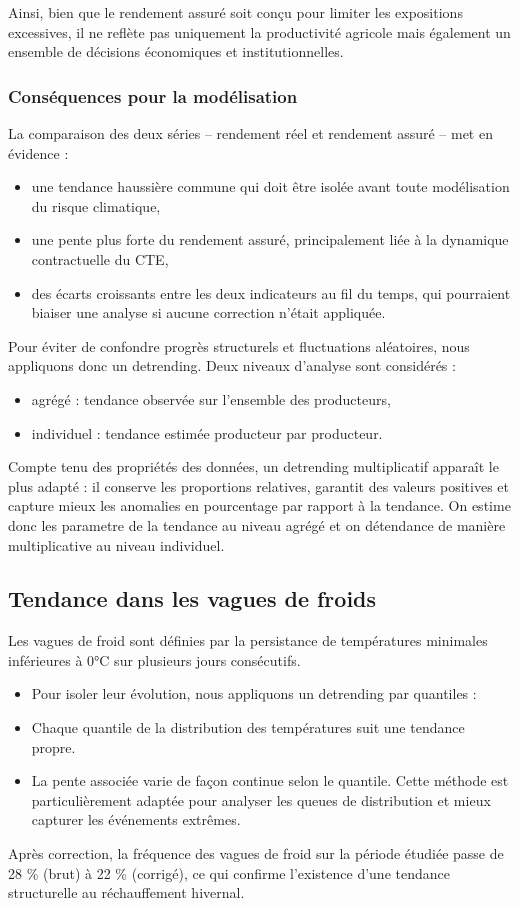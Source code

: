 \documentclass[11pt,a4paper,openright,twoside]{report}
\begin{document}
Ainsi, bien que le rendement assuré soit conçu pour limiter les expositions excessives, il ne reflète pas uniquement la productivité agricole mais également un ensemble de décisions économiques et institutionnelles.

\subsubsection{Conséquences pour la modélisation}
La comparaison des deux séries – rendement réel et rendement assuré – met en évidence :
\begin{itemize}
    \item une tendance haussière commune qui doit être isolée avant toute modélisation du risque climatique,
    \item une pente plus forte du rendement assuré, principalement liée à la dynamique contractuelle du CTE,
    \item des écarts croissants entre les deux indicateurs au fil du temps, qui pourraient biaiser une analyse si aucune correction n’était appliquée.
\end{itemize}
Pour éviter de confondre progrès structurels et fluctuations aléatoires, nous appliquons donc un detrending. Deux niveaux d’analyse sont considérés :
\begin{itemize}
    \item agrégé : tendance observée sur l’ensemble des producteurs,
    \item individuel : tendance estimée producteur par producteur.
\end{itemize}
Compte tenu des propriétés des données, un detrending multiplicatif apparaît le plus adapté : il conserve les proportions relatives, garantit des valeurs positives et capture mieux les anomalies en pourcentage par rapport à la tendance. On estime donc les parametre de la tendance au niveau agrégé et on détendance de manière multiplicative au niveau individuel. 

\subsection{Tendance dans les vagues de froids}
Les vagues de froid sont définies par la persistance de températures minimales inférieures à 0°C sur plusieurs jours consécutifs.
\begin{itemize}
    \item Pour isoler leur évolution, nous appliquons un detrending par quantiles :
    \item Chaque quantile de la distribution des températures suit une tendance propre.
    \item La pente associée varie de façon continue selon le quantile.
Cette méthode est particulièrement adaptée pour analyser les queues de distribution et mieux capturer les événements extrêmes.
\end{itemize}
Après correction, la fréquence des vagues de froid sur la période étudiée passe de 28 \% (brut) à 22 \% (corrigé), ce qui confirme l’existence d’une tendance structurelle au réchauffement hivernal.
\end{document}
